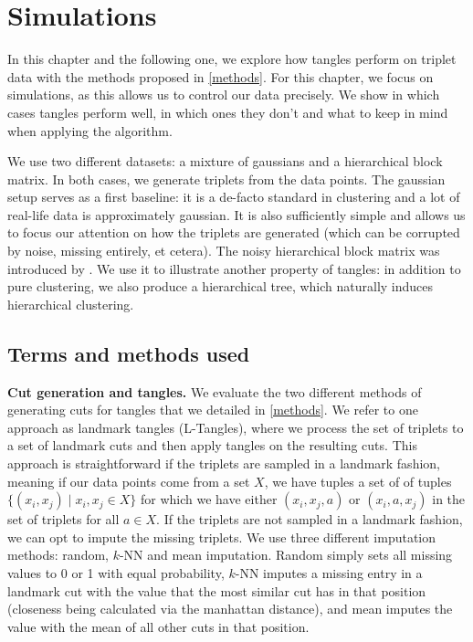 \chapter{Simulations}\label{simulations}
In this chapter and the following one, we explore how tangles perform on triplet data with the methods proposed in \autoref{methods}. 
For this chapter, we focus on simulations, as this allows us to control our data precisely.  
We show in which cases tangles perform well, in which ones they don't and what to keep in mind when applying the algorithm. 

We use two different datasets: a mixture of gaussians and a hierarchical block matrix. In both cases, we generate triplets from the data points.
The gaussian setup serves as a first baseline: it is a de-facto standard in clustering and a lot of real-life data is approximately gaussian. 
It is also sufficiently simple and allows us to focus our attention on how the triplets are generated (which can be corrupted by noise, missing entirely, et cetera). 
The noisy hierarchical block matrix was introduced by \cite{balakrishnanNoiseThresholdsSpectral2011}.
We use it to illustrate another property of tangles: in addition to pure clustering, we also produce a hierarchical tree, 
which naturally induces hierarchical clustering. 

\section{Terms and methods used}
\textbf{Cut generation and tangles.} We evaluate the two different methods of generating cuts for tangles that we detailed in \autoref{methods}. 
We refer to one approach as landmark tangles (L-Tangles), where we process the set of triplets to a set of landmark cuts and then apply tangles on the resulting cuts.
This approach is straightforward if the triplets are sampled in a landmark fashion, meaning if our data points come from a set $X$, 
we have tuples a set of of tuples $\{ (x_i, x_j)  \mid  x_i, x_j \in X \}$ for which we have either $(x_i, x_j, a)$ or $(x_i, a, x_j)$ in the set of triplets for all $a \in X$.
If the triplets are not sampled in a landmark fashion, we can opt to impute the missing triplets. We use three different imputation methods: random, $k$-NN and mean imputation.
Random simply sets all missing values to 0 or 1 with equal probability, $k$-NN imputes
a missing entry in a landmark cut with the value that the most similar cut has in that position (closeness being calculated via the manhattan distance), and mean 
imputes the value with the mean of all other cuts in that position. 

